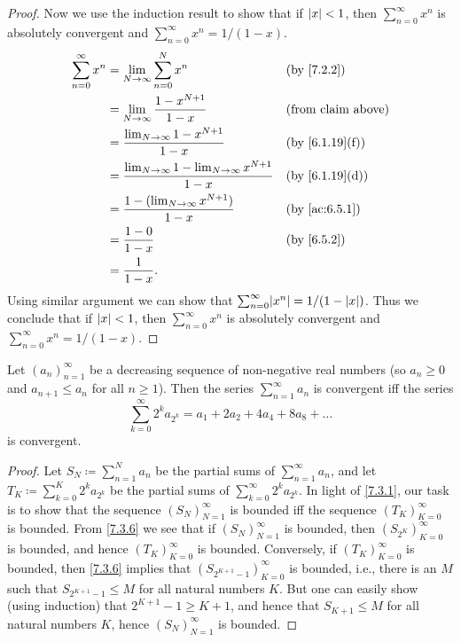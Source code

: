 \begin{proof}
  Now we use the induction result to show that if \(\left\lvert x\right\rvert < 1\), then \(\sum_{n = 0}^\infty x^n\) is absolutely convergent and \(\sum_{n = 0}^\infty x^n = 1 / (1 - x)\).
  \begin{align*}
    \sum_{n = 0}^\infty x^n & = \lim_{N \to \infty} \sum_{n = 0}^N x^n                               &  & \by{7.2.2}                   \\
                            & = \lim_{N \to \infty} \dfrac{1 - x^{N + 1}}{1 - x}                     &  & \text{(from claim above)}    \\
                            & = \dfrac{\lim_{N \to \infty} 1 - x^{N + 1}}{1 - x}                     &  & \text{(by \cref{6.1.19}(f))} \\
                            & = \dfrac{\lim_{N \to \infty} 1 - \lim_{N \to \infty} x^{N + 1}}{1 - x} &  & \text{(by \cref{6.1.19}(d))} \\
                            & = \dfrac{1 - (\lim_{N \to \infty} x^{N + 1})}{1 - x}                   &  & \by{ac:6.5.1}                \\
                            & = \dfrac{1 - 0}{1 - x}                                                 &  & \by{6.5.2}                   \\
                            & = \dfrac{1}{1 - x}.
  \end{align*}
  Using similar argument we can show that \(\sum_{n = 0}^\infty \abs{x^n} = 1 / (1 - \abs{x})\).
  Thus we conclude that if \(\left\lvert x\right\rvert < 1\), then \(\sum_{n = 0}^\infty x^n\) is absolutely convergent and \(\sum_{n = 0}^\infty x^n = 1 / (1 - x)\).
\end{proof}

\begin{prop}\label{7.3.4}
  Let \((a_n)_{n = 1}^\infty\) be a decreasing sequence of non-negative real numbers
  (so \(a_n \geq 0\) and \(a_{n + 1} \leq a_n\) for all \(n \geq 1\)).
  Then the series \(\sum_{n = 1}^\infty a_n\) is convergent iff the series
  \[
    \sum_{k = 0}^\infty 2^k a_{2^k} = a_1 + 2a_2 + 4a_4 + 8a_8 + \dots
  \]
  is convergent.
\end{prop}

\begin{proof}
  Let \(S_N \coloneqq \sum_{n = 1}^N a_n\) be the partial sums of \(\sum_{n = 1}^\infty a_n\), and let \(T_K \coloneqq \sum_{k = 0}^K 2^k a_{2^k}\) be the partial sums of \(\sum_{k = 0}^\infty 2^k a_{2^k}\).
  In light of \cref{7.3.1}, our task is to show that the sequence \((S_N)_{N = 1}^\infty\) is bounded iff the sequence \((T_K)_{K = 0}^\infty\) is bounded.
  From \cref{7.3.6} we see that if \((S_N)_{N = 1}^\infty\) is bounded, then \((S_{2^K})_{K = 0}^\infty\) is bounded, and hence \((T_K)_{K = 0}^\infty\) is bounded.
  Conversely, if \((T_K)_{K = 0}^\infty\) is bounded, then \cref{7.3.6} implies that \((S_{2^{K + 1} - 1})_{K = 0}^\infty\) is bounded, i.e., there is an \(M\) such that \(S_{2^{K + 1} - 1} \leq M\) for all natural numbers \(K\).
  But one can easily show (using induction) that \(2^{K + 1} - 1 \geq K + 1\), and hence that \(S_{K + 1} \leq M\) for all natural numbers \(K\), hence \((S_N)_{N = 1}^\infty\) is bounded.
\end{proof}

